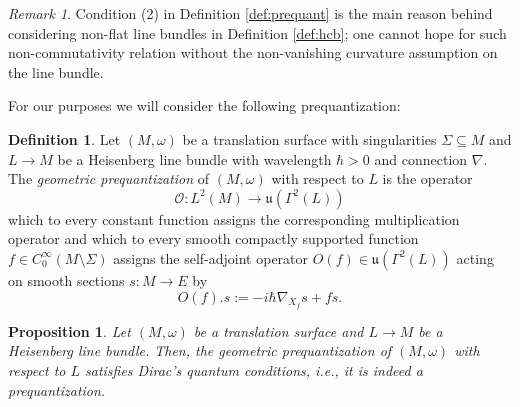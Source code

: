 \documentclass{amsart}
\newtheorem{proposition}[theorem]{Proposition}
\theoremstyle{definition}
\newtheorem{definition}[theorem]{Definition}
\theoremstyle{remark}
\newtheorem{remark}[theorem]{Remark}
\numberwithin{equation}{section}
\newcommand{\<}{{\langle}}
\renewcommand{\>}{{\rangle}}
\begin{document}
\begin{remark}
    Condition (2) in Definition \ref{def:prequant} is the main reason behind considering non-flat line bundles in Definition \ref{def:hcb}; one cannot hope for such non-commutativity relation without the non-vanishing curvature assumption on the line bundle.
\end{remark}

For our purposes we will consider the following prequantization:

\begin{definition}\label{def:geomprequant}
    Let $(M,\omega)$ be a translation surface with singularities $\Sigma \subseteq M$ and $L \to M$ be a Heisenberg line bundle with wavelength $\hbar > 0$ and connection $\nabla$. The \textit{geometric prequantization} of $(M,\omega)$ with respect to $L$ is the operator
    \[
    \mathcal{O} \colon L^2(M) \to \mathfrak{u}(\Gamma^2(L))
    \]
    which to every constant function assigns the corresponding multiplication operator and which to every smooth compactly supported function $f \in C_0^\infty(M \setminus \Sigma)$ assigns the self-adjoint operator $O(f) \in \mathfrak{u}(\Gamma^2(L))$ acting on smooth sections $s \colon M \to E$ by
    \[
    O(f).s := -i\hbar \nabla_{X_f} s + fs.
    \]
\end{definition}

\begin{proposition}
    Let $(M,\omega)$ be a translation surface and $L \to M$ be a Heisenberg line bundle. Then, the geometric prequantization of $(M,\omega)$ with respect to $L$ satisfies Dirac's quantum conditions, i.e., it is indeed a prequantization.
\end{proposition}
\end{document}
